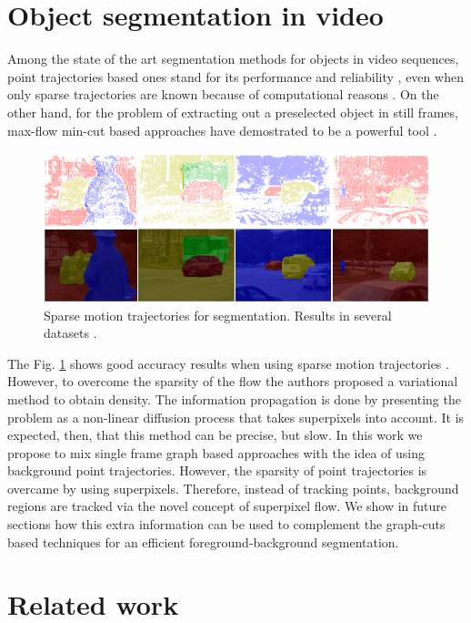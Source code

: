 \section{Object segmentation in video}

Among the state of the art segmentation methods for objects in video
sequences, point trajectories based ones stand for its performance and 
reliability \cite{c33}, even when only sparse trajectories are known because of
computational reasons \cite{c34}. On the other hand, for the problem of extracting out a 
preselected object in still frames, max-flow min-cut based approaches 
have demostrated to be a powerful tool \cite{c14}\cite{c18}. 

   \begin{figure}[tbhp]
      \centering
      \includegraphics[height=0.275\textheight]{../images/point_traj_segm.png}
      \caption{  Sparse motion trajectories for segmentation. Results in several datasets  \cite{c34}. }
      \label{pt_seg}
   \end{figure}


The Fig. \ref{pt_seg} shows good accuracy results when using sparse motion trajectories \cite{c34}. However, to overcome 
the sparsity of the flow the authors proposed a variational method to obtain density. The information propagation is done 
by presenting the problem as a non-linear diffusion process that takes superpixels into account. It is expected, then, that this 
method can be precise, but slow.
In this work we propose to mix single frame graph based approaches with the idea 
of using background point trajectories. However, the sparsity of point trajectories is 
overcame by using superpixels. Therefore, instead of tracking points, background regions are tracked via the novel concept of 
superpixel flow. 
We show in future sections how this extra information can be used to complement the
graph-cuts based techniques for an efficient foreground-background segmentation. 

\section{Related work}

